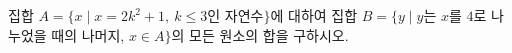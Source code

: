 집합 $A=\{x \mid x=2k^2+1,\ k\le 3$인 자연수$\}$에 대하여 집합 $B=\{y \mid y$는 $x$를 $4$로 나누었을 때의 나머지, $x\in A\}$의 모든 원소의 합을 구하시오.
